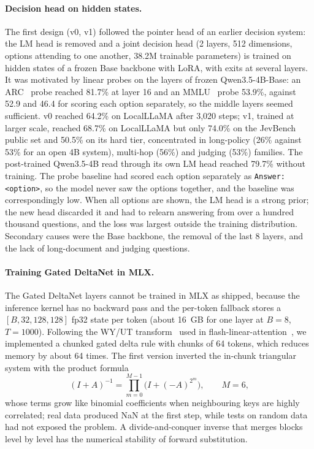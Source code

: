 \documentclass[10pt]{article}
\begin{document}
\paragraph{Decision head on hidden states.}
The first design (v0, v1) followed the pointer head of an earlier decision system: the LM head is removed and a joint decision head (2 layers, 512 dimensions, options attending to one another, 38.2M trainable parameters) is trained on hidden states of a frozen Base backbone with LoRA, with exits at several layers.
It was motivated by linear probes on the layers of frozen Qwen3.5-4B-Base: an ARC~\cite{arc} probe reached 81.7\% at layer 16 and an MMLU~\cite{mmlu} probe 53.9\%, against 52.9 and 46.4 for scoring each option separately, so the middle layers seemed sufficient.
v0 reached 64.2\% on LocalLLaMA after 3,020 steps; v1, trained at larger scale, reached 68.7\% on LocalLLaMA but only 74.0\% on the JevBench public set and 50.5\% on its hard tier, concentrated in long-policy (26\% against 53\% for an open 4B system), multi-hop (56\%) and judging (53\%) families.
The post-trained Qwen3.5-4B read through its own LM head reached 79.7\% without training.
The probe baseline had scored each option separately as \texttt{Answer: <option>}, so the model never saw the options together, and the baseline was correspondingly low.
When all options are shown, the LM head is a strong prior; the new head discarded it and had to relearn answering from over a hundred thousand questions, and the loss was largest outside the training distribution.
Secondary causes were the Base backbone, the removal of the last 8 layers, and the lack of long-document and judging questions.

\paragraph{Training Gated DeltaNet in MLX.}
The Gated DeltaNet layers cannot be trained in MLX as shipped, because the inference kernel has no backward pass and the per-token fallback stores a $[B,32,128,128]$ fp32 state per token (about 16~GB for one layer at $B=8$, $T=1000$).
Following the WY/UT transform~\cite{deltapar} used in flash-linear-attention~\cite{fla}, we implemented a chunked gated delta rule with chunks of 64 tokens, which reduces memory by about 64 times.
The first version inverted the in-chunk triangular system with the product formula
\begin{equation*}
(I+A)^{-1} = \prod_{m=0}^{M-1}\bigl(I + (-A)^{2^m}\bigr),\qquad M=6,
\end{equation*}
whose terms grow like binomial coefficients when neighbouring keys are highly correlated; real data produced NaN at the first step, while tests on random data had not exposed the problem.
A divide-and-conquer inverse that merges blocks level by level has the numerical stability of forward substitution.
\end{document}

